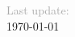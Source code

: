 \documentclass[a4paper%
]{fortysecondscv}
\begin{document}
 \makefrontsidebar \newpage \null  %

% 
% 
% 

\vfill 


\textcolor{darkgray}{%
    Last update:
    } \\
\today
\end{document}
